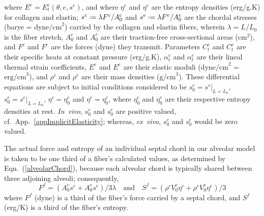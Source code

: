 where $E^e = E^e_t ( \theta , e , s^e )$, and where $\eta^c$ and $\eta^e$ are the entropy densities (erg/g.K) for collagen and elastin; $s^c \defeq \lambda F^c / A^c_0$ and $s^e \defeq \lambda F^e / A_0^e$ are the chordal stresses (barye = $\text{dyne/cm}^2$) carried by the collagen and elastin fibers, wherein $\lambda = L/L_0$ is the fiber stretch, $A^c_0$ and $A^e_0$ are their traction-free cross-sectional areas ($\text{cm}^2$), and $F^c$ and $F^e$ are the forces (dyne) they transmit.  Parameters $C^c_t$ and $C^e_t$ are their specific heats at constant pressure (erg/g.K), $\alpha^c_t$ and $\alpha^e_t$ are their lineal thermal strain coefficients, $E^e$ and $E^e$ are their elastic moduli ($\text{dyne/cm}^2$ = $\text{erg/cm}^3$), and $\rho^c$ and $\rho^e$ are their mass densities ($\text{g/cm}^3$).  These differential equations are subject to initial conditions considered to be $s^c_0 = s^c |_{L = L_0}$, $s^e_0 = s^e |_{L = L_0}$, $\eta^c = \eta^c_0$ and $\eta^e = \eta^e_0$, where  $\eta_0^c$ and $\eta_0^e$ are their respective entropy densities at rest.  \textit{In~vivo}, $s^c_0$ and $s^e_0$ are positive valued, cf.\ App.~\ref{appImplicitElasticity}; whereas, \textit{ex~vivo}, $s^c_0$ and $s^e_0$ would be zero valued.  

The actual force and entropy of an individual septal chord in our alveolar model is taken to be one third of a fiber's calculated values, as determined by Eqn.~(\ref{alveolarChord}), because each alveolar chord is typically shared between three adjoining alveoli; consequently, 
\begin{equation}
    \label{septalChordCEs}
    F^f = ( A_0^c s^c + A_0^e s^e ) / 3 \lambda 
    \quad \text{and} \quad
    S^f = ( \rho^c V_0^c \eta^c + \rho^e V_0^e \eta^e ) / 3 
\end{equation}  
where $F^f$ (dyne) is a third of the fiber's force carried by a septal chord, and $S^f$ (erg/K) is a third of the fiber's entropy.

